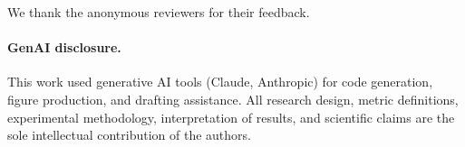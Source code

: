 \documentclass[sigconf,anonymous]{acmart}
\begin{document}
\begin{acks}
We thank the anonymous reviewers for their feedback.

\paragraph{GenAI disclosure.} This work used generative AI tools (Claude, Anthropic) for code generation, figure production, and drafting assistance. All research design, metric definitions, experimental methodology, interpretation of results, and scientific claims are the sole intellectual contribution of the authors.
\end{acks}

\FloatBarrier


\end{document}
